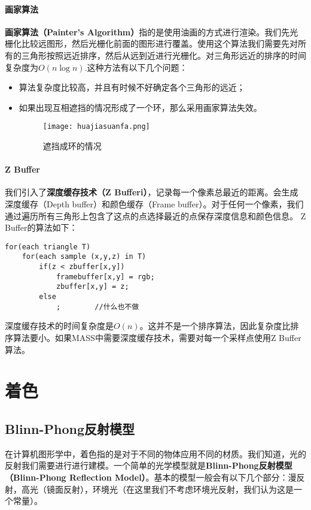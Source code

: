 \documentclass[openany]{progbookcn}
\begin{document}
\subsection{画家算法}
\textbf{画家算法（Painter's Algorithm）}指的是使用油画的方式进行渲染。我们先光栅化比较远图形，然后光栅化前面的图形进行覆盖。使用这个算法我们需要先对所有的三角形按照远近排序，然后从远到近进行光栅化。对三角形远近的排序的时间复杂度为$O(n\log n)$.这种方法有以下几个问题：
\begin{itemize}
	\item 算法复杂度比较高，并且有时候不好确定各个三角形的远近；
	\item 如果出现互相遮挡的情况形成了一个环，那么采用画家算法失效。
	\begin{figure}[H]
		\centering
		\texttt{[image: huajiasuanfa.png]}
		\caption{遮挡成环的情况}
		\label{fig:zhedang}
	\end{figure}
	
\end{itemize}

\subsection{Z Buffer}
我们引入了\textbf{深度缓存技术（Z Bufferi）}，记录每一个像素总最近的距离。会生成深度缓存（Depth buffer）和颜色缓存（Frame buffer）。对于任何一个像素，我们通过遍历所有三角形上包含了这点的点选择最近的点保存深度信息和颜色信息。
Z Buffer的算法如下：
\begin{lstlisting}
for(each triangle T)
	for(each sample (x,y,z) in T)
		if(z < zbuffer[x,y])
			framebuffer[x,y] = rgb;
			zbuffer[x,y] = z;
		else
			;        //什么也不做
\end{lstlisting}
深度缓存技术的时间复杂度是$O(n)$。这并不是一个排序算法，因此复杂度比排序算法要小。如果MASS中需要深度缓存技术，需要对每一个采样点使用Z Buffer算法。

\part{着色}

\chapter{Blinn-Phong反射模型}
在计算机图形学中，着色指的是对于不同的物体应用不同的材质。我们知道，光的反射我们需要进行进行建模。一个简单的光学模型就是\textbf{Blinn-Phong反射模型（Blinn-Phong Reflection Model）}。基本的模型一般会有以下几个部分：漫反射，高光（镜面反射），环境光（在这里我们不考虑环境光反射，我们认为这是一个常量）。
\end{document}
